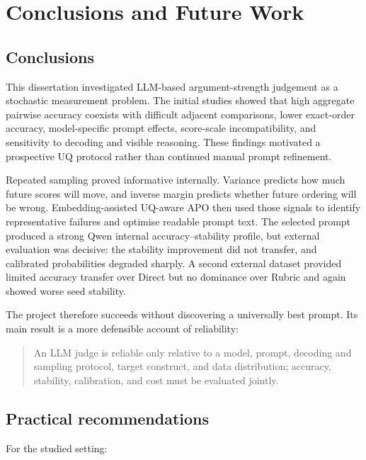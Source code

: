 \documentclass[11pt,twoside,a4paper]{report}
\begin{document}
\chapter{Conclusions and Future Work}
\label{chap:conclusion}

\section{Conclusions}

This dissertation investigated LLM-based argument-strength judgement as a stochastic
measurement problem.  The initial studies showed that high aggregate pairwise
accuracy coexists with difficult adjacent comparisons, lower exact-order accuracy,
model-specific prompt effects, score-scale incompatibility, and sensitivity to
decoding and visible reasoning.  These findings motivated a prospective UQ protocol
rather than continued manual prompt refinement.

Repeated sampling proved informative internally.  Variance predicts how much future
scores will move, and inverse margin predicts whether future ordering will be wrong.
Embedding-assisted UQ-aware APO then used those signals to identify representative
failures and optimise readable prompt text.  The selected prompt produced a strong
Qwen internal accuracy--stability profile, but external evaluation was decisive: the
stability improvement did not transfer, and calibrated probabilities degraded
sharply.  A second external dataset provided limited accuracy transfer over Direct
but no dominance over Rubric and again showed worse seed stability.

The project therefore succeeds without discovering a universally best prompt.  Its
main result is a more defensible account of reliability:
\begin{quote}
An LLM judge is reliable only relative to a model, prompt, decoding and sampling
protocol, target construct, and data distribution; accuracy, stability, calibration,
and cost must be evaluated jointly.
\end{quote}

\section{Practical recommendations}

For the studied setting:
\end{document}
